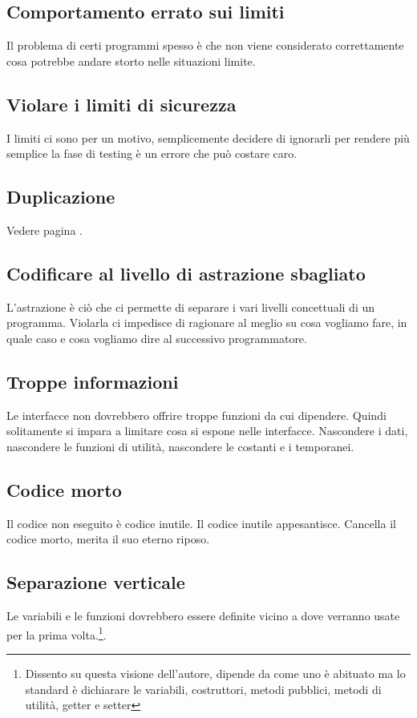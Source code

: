 \documentclass[11pt,a4paper]{book}
\begin{document}
\subsection{Comportamento errato sui limiti}
Il problema di certi programmi spesso è che non viene considerato correttamente cosa potrebbe andare storto nelle situazioni limite.

\subsection{Violare i limiti di sicurezza}
I limiti ci sono per un motivo, semplicemente decidere di ignorarli per rendere più semplice la fase di testing è un errore che può costare caro.

\subsection{Duplicazione}
Vedere pagina \pageref{par: duplicazione}.

\subsection{Codificare al livello di astrazione sbagliato}
L'astrazione è ciò che ci permette di separare i vari livelli concettuali di un programma. Violarla ci impedisce di ragionare al meglio su cosa vogliamo fare, in quale caso e cosa vogliamo dire al successivo programmatore.

\subsection{Troppe informazioni}
Le interfacce non dovrebbero offrire troppe funzioni da cui dipendere. Quindi solitamente si impara a limitare cosa si espone nelle interfacce. Nascondere i dati, nascondere le funzioni di utilità, nascondere le costanti e i temporanei.

\subsection{Codice morto}
Il codice non eseguito è codice inutile. Il codice inutile appesantisce. Cancella il codice morto, merita il suo eterno riposo.

\subsection{Separazione verticale}
Le variabili e le funzioni dovrebbero essere definite vicino a dove verranno usate per la prima volta.\footnote{Dissento su questa visione dell'autore, dipende da come uno è abituato ma lo standard è dichiarare le variabili, costruttori, metodi pubblici, metodi di utilità, getter e setter}.
\end{document}
